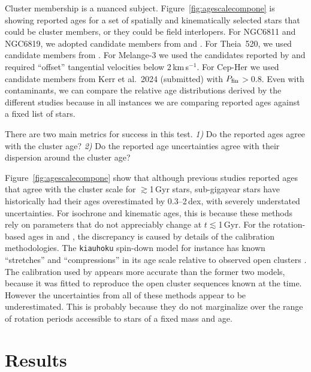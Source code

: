 \documentclass[11pt,twocolumn,tighten]{aastex63}
\newcommand{\kms}{{km\,s$^{-1}$}}
\begin{document}
Cluster membership is a nuanced subject.
Figure~\ref{fig:agescalecompone} is showing reported ages for a set of
spatially and kinematically selected stars that could be
cluster members, or they could be field interlopers.  For NGC6811 and
NGC6819, we adopted candidate members from
\citet{2018A&A...618A..93C,CantatGaudin_2020} and
\citet{Kounkel_2020}.  
For Theia~520, we used candidate members from \citet{Kounkel_2020}.
For Melange-3 we used the candidates reported
by \citet{Barber_2022} and required ``offset'' tangential velocities
below 2\,\kms.  For Cep-Her we used candidate members from Kerr et al.~2024 (submitted)
with $P_{\rm fin}$$>$0.8.  Even with
contaminants, we can compare the relative age distributions derived by
the different studies because in all instances we are comparing
reported ages against a fixed list of stars.

There are two main metrics for success in this test. {\it 1)}
Do the reported ages agree with the cluster age? {\it 2)} Do the
reported age uncertainties agree with their dispersion
around the cluster age?

Figure~\ref{fig:agescalecompone} show that although
previous studies reported ages that agree with the cluster scale for
$\gtrsim$1\,Gyr stars, sub-gigayear stars have historically had their ages 
overestimated by 0.3--2\,dex, with severely understated uncertainties.  
For isochrone and kinematic ages, this is because these
methods rely on parameters that do not appreciably change at
$t$$\lesssim$1\,Gyr.  For the rotation-based ages in
\citet{2023ApJ...952..131M} and \citet{2024AJ....167..159L}, the
discrepancy is
caused by details of the calibration methodologies.  The
\texttt{kiauhoku} spin-down model for instance has known
``stretches'' and ``compressions'' in its age scale relative to observed open clusters
\citep[see][Sec. 7.3]{2023ApJ...952..131M}.
The \citet{Mamajek_2008}
calibration used by \citet{Reinhold_2015} appears more accurate than the former
two models, because it 
was fitted to reproduce the open cluster sequences known at the time.  However the
uncertainties from all of these methods appear to be underestimated.  This
is probably because
they do not marginalize over
the range of rotation periods accessible to stars of a fixed
mass and age.



\section{Results}
\label{sec:results}
\end{document}
